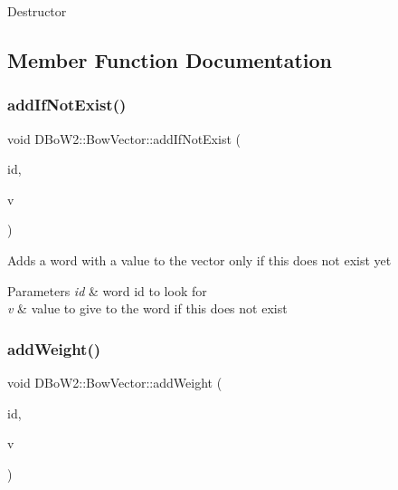Destructor 

\subsection{Member Function Documentation}
\mbox{\label{class_d_bo_w2_1_1_bow_vector_a5ddf10e444d10425e5bd3568dc7ffe5e}} 
\subsubsection{\texorpdfstring{add\+If\+Not\+Exist()}{addIfNotExist()}}
{\footnotesize\ttfamily void D\+Bo\+W2\+::\+Bow\+Vector\+::add\+If\+Not\+Exist (\begin{DoxyParamCaption}\item[{\mbox{\hyperlink{namespace_d_bo_w2_ab1a0d3283b2d4690a383372ed20bfeb5}{Word\+Id}}}]{id,  }\item[{\mbox{\hyperlink{namespace_d_bo_w2_a55fcd7333e591a38e96b91f41bc182f6}{Word\+Value}}}]{v }\end{DoxyParamCaption})}

Adds a word with a value to the vector only if this does not exist yet 
\begin{DoxyParams}{Parameters}
{\em id} & word id to look for \\
\hline
{\em v} & value to give to the word if this does not exist \\
\hline
\end{DoxyParams}
\mbox{\label{class_d_bo_w2_1_1_bow_vector_a3ac92a805b252c93dc6535240d02df47}} 
\subsubsection{\texorpdfstring{add\+Weight()}{addWeight()}}
{\footnotesize\ttfamily void D\+Bo\+W2\+::\+Bow\+Vector\+::add\+Weight (\begin{DoxyParamCaption}\item[{\mbox{\hyperlink{namespace_d_bo_w2_ab1a0d3283b2d4690a383372ed20bfeb5}{Word\+Id}}}]{id,  }\item[{\mbox{\hyperlink{namespace_d_bo_w2_a55fcd7333e591a38e96b91f41bc182f6}{Word\+Value}}}]{v }\end{DoxyParamCaption})}

